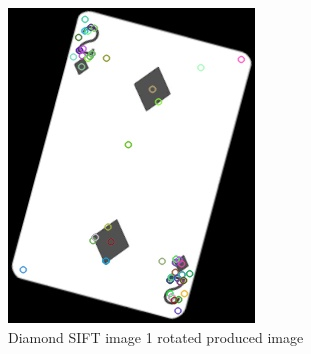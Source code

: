 \documentclass[conference]{IEEEtran}
\begin{document}
\begin{figure}[!htb]
\begin{minipage}[b]{0.2\textwidth}
    \includegraphics[width=\textwidth]{../programme/results/Task_1/rotated_experiements/SIFT/diamond/image_1.jpg}
    \caption{Diamond SIFT image 1 rotated produced image}
    \label{Diamond SIFT image 1 rotated produced image}
  \end{minipage}
  \hfill
  \begin{minipage}[b]{0.2\textwidth}

\end{minipage}
\end{figure}
\end{document}
